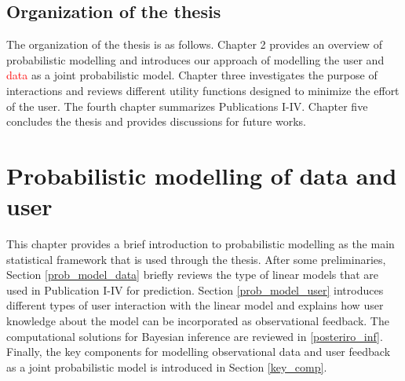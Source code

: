 \documentclass[dissertation,math,vertlayout,pdfa,colorlinks]{aaltoseries}
\begin{document}
\section{Organization of the thesis}

The organization of the thesis is as follows. Chapter 2 provides an overview of probabilistic modelling and introduces our approach of modelling the user and \textcolor{red}{data} as a joint probabilistic model. Chapter three investigates the purpose of interactions and reviews different utility functions designed to minimize the effort of the user. The fourth chapter summarizes Publications I-IV. Chapter five concludes the thesis and provides discussions for future works.



\chapter{Probabilistic modelling of data and user} \label{prob_model_data_user}



This chapter provides a brief introduction to probabilistic modelling as the main statistical framework that is used through the thesis. After some preliminaries,  Section \ref{prob_model_data} briefly reviews the type of linear models that are used in Publication I-IV for prediction. %
Section \ref{prob_model_user} introduces different types of user interaction with the linear model and explains how user knowledge about the model can be incorporated as observational feedback. The computational solutions for Bayesian inference are reviewed in \ref{posteriro_inf}. Finally, the key components for modelling observational data and user feedback as a joint probabilistic model is introduced in Section \ref{key_comp}.
\end{document}
